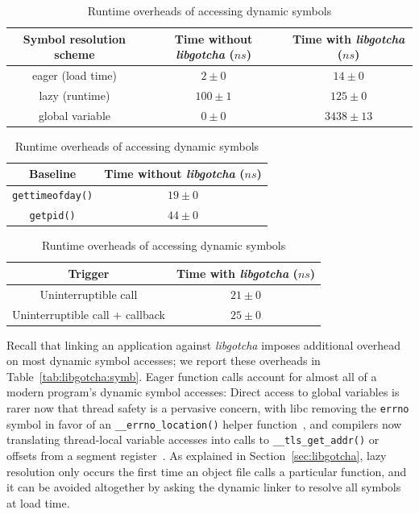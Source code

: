 \begin{table}
	\begin{minipage}{2\columnwidth}
	\centering
	\begin{tabular}{c | c c}
	Symbol resolution scheme & Time without \textit{libgotcha} ($ns$) & Time with \textit{libgotcha} ($ns$) \\
	\hline
	eager (load time) & $2 \pm 0$ & $14 \pm 0$ \\
	lazy (runtime) & $100 \pm 1$ & $125 \pm 0$ \\
	global variable & $0 \pm 0$ & $3438 \pm 13$
	\end{tabular}
	\label{tab:libgotcha:symb}
	\end{minipage}

	\begin{minipage}{\columnwidth}
	\centering
	\begin{tabular}{c | c}
	Baseline & Time without \textit{libgotcha} ($ns$) \\
	\hline
	\texttt{gettimeofday()} & $19 \pm 0$ \\
	\texttt{getpid()} & $44 \pm 0$
	\end{tabular}
	\label{tab:libgotcha:baseline}
	\end{minipage}
%
	\begin{minipage}{\columnwidth}
	\centering
	\begin{tabular}{c | c}
	Trigger & Time with \textit{libgotcha} ($ns$) \\
	\hline
	Uninterruptible call & $21 \pm 0$ \\
	Uninterruptible call + callback & $25 \pm 0$
	\end{tabular}
	\label{tab:libgotcha:whitelist}
	\end{minipage}
\caption{Runtime overheads of accessing dynamic symbols}
\end{table}

Recall that linking an application against \textit{libgotcha} imposes additional
overhead on most dynamic symbol accesses; we report these overheads in
Table~\ref{tab:libgotcha:symb}.  Eager function calls account for almost all of a
modern program's dynamic symbol accesses:  Direct access to global variables is rarer
now that thread safety is a pervasive concern, with libc removing the \texttt{errno}
symbol in favor of an \texttt{\_\_errno\_location()} helper
function~\cite{www-lsb-errno}, and compilers now translating thread-local variable
accesses into calls to \texttt{\_\_tls\_get\_addr()} or offsets from a segment
register~\cite{drepper:spec2013}.  As explained in Section~\ref{sec:libgotcha}, lazy
resolution only occurs the first time an object file calls a particular function, and
it can be avoided altogether by asking the dynamic linker to resolve all symbols at
load time.

